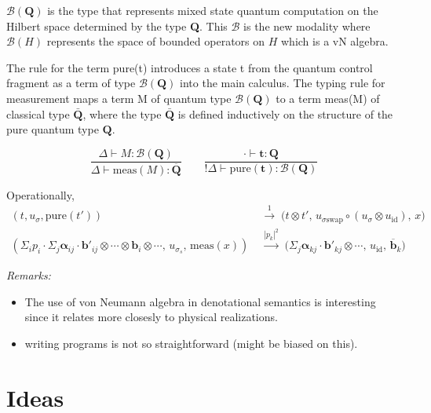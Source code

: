 \documentclass[12pt]{article}
\begin{document}
$\mathcal{B}(\textbf{Q})$ is the type that represents mixed state quantum computation on the Hilbert space determined by
the type \textbf{Q}. This $\mathcal{B}$ is the new modality where $\mathcal{B}(H)$ represents the space of bounded
operators on $H$ which is a vN algebra.

The rule for the term \textsf{pure}(t) introduces a state t from the quantum control fragment as a term of type $\mathcal{B}(\textbf{Q})$ into the main calculus. The typing rule for measurement maps a term M of quantum type $\mathcal{B}(\textbf{Q})$ to a term \textsf{meas}(M) of classical type $\bar{\textbf{Q}}$, where the type $\bar{\textbf{Q}}$ is defined inductively on the structure of the pure quantum type $\textbf{Q}$.

\[
  \frac{\Delta \vdash M : \mathcal{B}(\textbf{Q})}{\Delta \vdash \mathrm{meas}(M) : \overline{\textbf{Q}}}
  \hspace{2em}
\frac{\cdot \vdash \textbf{t} : \textbf{Q}}{!\Delta \vdash \mathrm{pure}(\textbf{t}) : \mathcal{B}(\textbf{Q})}
\]

Operationally,
\[
\begin{aligned}
(t, u_{\sigma}, \mathrm{pure}(t')) &\;\xrightarrow{1}\;
\bigl(t \otimes t',\, u_{\sigma \mathrm{swap}} \circ (u_{\sigma} \otimes u_{\mathrm{id}}),\, x\bigr) \\[1em]
(\Sigma_i p_i \cdot \Sigma_j \boldsymbol{\alpha}_{ij} \cdot \boldsymbol{b}'_{ij} \otimes \cdots \otimes \boldsymbol{b}_i \otimes \cdots,\,
u_{\sigma_s},\, \mathrm{meas}(x))
&\;\xrightarrow{|\!p_k\!|^2}\;
\bigl(\Sigma_j \boldsymbol{\alpha}_{kj} \cdot \boldsymbol{b}'_{kj} \otimes \cdots,\,
u_{\mathrm{id}},\, \overline{\boldsymbol{b}}_k \bigr)
\end{aligned}
\]

\textit{Remarks:}
\begin{itemize}
        \item The use of von Neumann algebra in denotational semantics is interesting since it relates more closesly to
        physical realizations.
  \item writing programs is not so straightforward (might be biased on this).
\end{itemize}

\section{Ideas}
\end{document}
